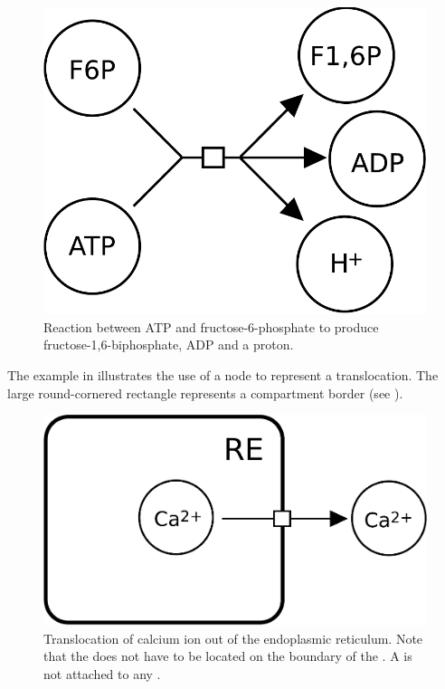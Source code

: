 \begin{figure}[H]
  \centering
  \includegraphics[scale = 0.3]{examples/process-reaction}
  \caption{Reaction between ATP and fructose-6-phosphate to produce fructose-1,6-biphosphate, ADP and a proton.}
  \label{fig:trans-react}
\end{figure}

The example in  illustrates the use of a  node to represent a translocation. The large round-cornered rectangle represents a compartment border (see ).

\begin{figure}[H]
  \centering
  \includegraphics[scale = 0.3]{examples/process-translocation}
  \caption{Translocation of calcium ion out of the endoplasmic reticulum. Note that the  does not have to be located on the boundary of the . A  is not attached to any .}
  \label{fig:trans-trans}
\end{figure}

